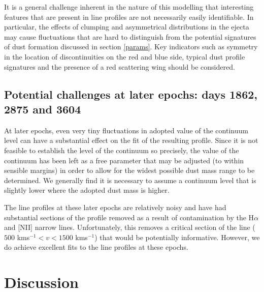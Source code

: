 \documentclass[useAMS,usenatbib,usegraphicx]{mnras}
\begin{document}
It is a general challenge inherent in the nature of this modelling that interesting features that are present in line profiles are not necessarily easily identifiable.  In particular, the effects of clumping and asymmetrical distributions in the ejecta may cause fluctuations that are hard to distinguish from the potential signatures of dust formation discussed in section \ref{params}.  Key indicators such as symmetry in the location of discontinuities on the red and blue side, typical dust profile signatures and the presence of a red scattering wing should be considered.


\subsection{Potential challenges at later epochs: days 1862, 2875 and 3604}

At later epochs, even very tiny fluctuations in adopted value of the continuum level can have a substantial effect on the fit of the resulting profile.  Since it is not feasible to establish the level of the continuum so precisely, the value of the continuum has been left as a free parameter that may be adjusted (to within sensible margins) in order to allow for the widest possible dust mass range to be determined.  We generally find it is necessary to assume  a continuum level that is slightly lower where the adopted dust mass is higher.

The line profiles at these later epochs are relatively noisy and have had substantial sections of the profile removed as a result of contamination by the H$\alpha$ and [NII] narrow lines.  Unfortunately, this removes a critical section of the line ($500$ kms$^{-1}<v<1500$ kms$^{-1}$) that would be potentially informative.  However, we do achieve excellent fits to the line profiles at these epochs.






\section{Discussion}
\label{discuss}
\end{document}
